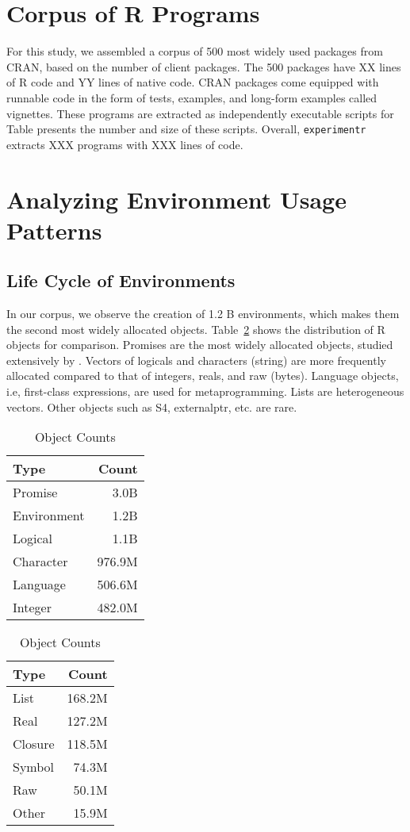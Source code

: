 \documentclass[10pt,review,sigplan,anonymous=true]{acmart}
\newcommand{\experimentr}{\texttt{experimentr}\xspace}
\begin{document}
\section{Corpus of R Programs}

For this study, we assembled a corpus of 500 most widely used packages from
CRAN, based on the number of client packages. The 500 packages have XX lines of
R code and YY lines of native code. CRAN packages come equipped with runnable
code in the form of tests, examples, and long-form examples called vignettes.
These programs are extracted as independently executable scripts for Table
presents the number and size of these scripts. Overall,
\experimentr extracts XXX programs with XXX lines of code.

\section{Analyzing Environment Usage Patterns}

\subsection{Life Cycle of Environments}
In our corpus, we observe the creation of 1.2 B environments, which makes them
the second most widely allocated objects. Table~\ref{table:object_count_dist}
shows the distribution of R objects for comparison. Promises are the most widely
allocated objects, studied extensively by \citet{oopsla19b}. Vectors of logicals
and characters (string) are more frequently allocated compared to that of
integers, reals, and raw (bytes). Language objects, i.e, first-class
expressions, are used for metaprogramming. Lists are heterogeneous vectors.
Other objects such as S4, externalptr, etc. are rare.

\begin{table}
  \vspace{-3mm}
  \small
  \caption{Object Counts} \label{table:object_count_dist}
  \centering
  \begin{tabular}{lr}
    \toprule
    \textbf{Type}&\textbf{Count}\\
    \midrule
    Promise&3.0B\\
    Environment&1.2B\\
    Logical&1.1B\\
    Character&976.9M\\
    Language&506.6M\\
    Integer&482.0M\\
    \bottomrule
  \end{tabular}
  \begin{tabular}{lr}
    \toprule
    \textbf{Type}&\textbf{Count}\\
    \midrule
    List&168.2M\\
    Real&127.2M\\
    Closure&118.5M\\
    Symbol&74.3M\\
    Raw&50.1M\\
    Other&15.9M\\
    \bottomrule
  \end{tabular}
\end{table}
\end{document}
